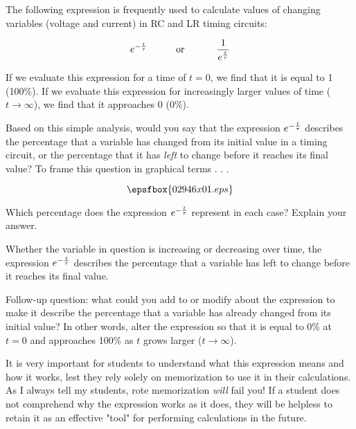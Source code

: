 

The following expression is frequently used to calculate values of changing variables (voltage and current) in RC and LR timing circuits:

$$e^{-{t \over \tau}} \hbox{\hskip 30pt or \hskip 30pt} {1 \over {e^{t \over \tau}}}$$

If we evaluate this expression for a time of $t = 0$, we find that it is equal to 1 (100\%).  If we evaluate this expression for increasingly larger values of time ($t \to \infty$), we find that it approaches 0 (0\%).

Based on this simple analysis, would you say that the expression $e^{-{t \over \tau}}$ describes the percentage that a variable has changed from its initial value in a timing circuit, or the percentage that it has {\it left} to change before it reaches its final value?  To frame this question in graphical terms . . .

$$\epsfbox{02946x01.eps}$$

Which percentage does the expression $e^{-{t \over \tau}}$ represent in each case?  Explain your answer.







Whether the variable in question is increasing or decreasing over time, the expression $e^{-{t \over \tau}}$ describes the percentage that a variable has left to change before it reaches its final value.

\vskip 10pt

Follow-up question: what could you add to or modify about the expression to make it describe the percentage that a variable has already changed from its initial value?  In other words, alter the expression so that it is equal to 0\% at $t = 0$ and approaches 100\% as $t$ grows larger ($t \to \infty$).







It is very important for students to understand what this expression means and how it works, lest they rely solely on memorization to use it in their calculations.  As I always tell my students, rote memorization {\it will} fail you!  If a student does not comprehend why the expression works as it does, they will be helpless to retain it as an effective "tool" for performing calculations in the future.

